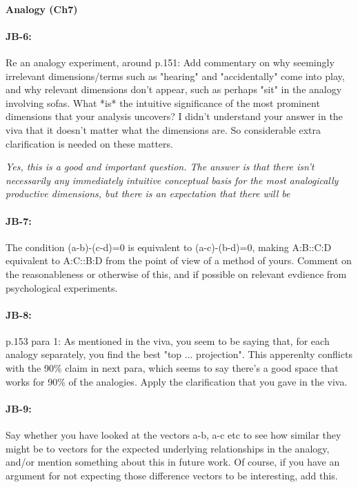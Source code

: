 \documentclass[11pt,a4paper]{article}
\newcommand{\res}[1]{\vspace{0.25cm} \begin{adjustwidth}{1cm}{}\emph{#1}\end{adjustwidth}}
\begin{document}
\paragraph{Analogy  (Ch7)}

\paragraph{JB-6:} Re an analogy experiment, around p.151: Add commentary on why seemingly irrelevant dimensions/terms such as "hearing" and "accidentally" come into play, and why relevant dimensions don't appear, such as perhaps "sit" in the analogy involving sofas. What *is* the intuitive significance of the most prominent dimensions that your analysis uncovers? I didn't understand your answer in the viva that it doesn't matter what the dimensions are. So considerable extra clarification is needed on these matters.

\res{Yes, this is a good and important question.  The answer is that there isn't necessarily any immediately intuitive conceptual basis for the most analogically productive dimensions, but there is an expectation that there will be }

\paragraph{JB-7:} The condition (a-b)-(c-d)=0 is equivalent to (a-c)-(b-d)=0, making A:B::C:D equivalent to A:C::B:D from the point of view of a method of yours. Comment on the reasonableness or otherwise of this, and if possible on relevant evdience from psychological experiments.

\paragraph{JB-8:} p.153 para 1: As mentioned in the viva, you seem to be saying that, for each analogy separately, you find the best "top ... projection". This apperenlty conflicts with the 90\% claim in next para, which seems to say there's a good space that works for 90\% of the analogies. Apply the clarification that you gave in the viva.

\paragraph{JB-9:} Say whether you have looked at the vectors a-b, a-c etc to see how similar they might be to vectors for the expected underlying relationships in the analogy, and/or mention something about this in future work. Of course, if you have an argument for not expecting those difference vectors to be interesting, add this.
\end{document}
